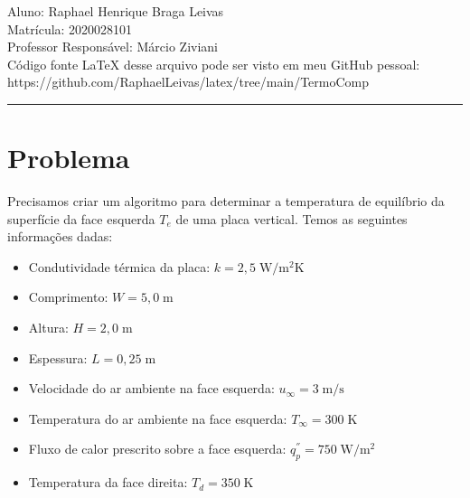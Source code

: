 \documentclass[12pt]{scrartcl}
\newcommand{\un}[1]{\;\textrm{#1}}
\begin{document}



\pagestyle{fancy}

\fancyhead{}
\fancyfoot{}

\begin{center}
    Aluno: Raphael Henrique Braga Leivas \\
    Matrícula: 2020028101 \\
    Professor Responsável: Márcio Ziviani \\[20pt]

    Código fonte LaTeX desse arquivo pode ser visto em meu GitHub pessoal: https://github.com/RaphaelLeivas/latex/tree/main/TermoComp
\end{center}

\hrule

\section{Problema}

Precisamos criar um algoritmo para determinar a temperatura de equilíbrio da superfície
da face esquerda $T_e$ de uma placa vertical. Temos as seguintes informações dadas:

\begin{itemize}
    \item Condutividade térmica da placa: $k=2,5 \un{W/m$^2$K}$
    \item Comprimento: $W=5,0 \un{m}$
    \item Altura: $H=2,0 \un{m}$
    \item Espessura: $L=0,25 \un{m}$
    \item Velocidade do ar ambiente na face esquerda: $u_{\infty}=3 \un{m/s}$
    \item Temperatura do ar ambiente na face esquerda: $T_{\infty}=300 \un{K}$
    \item Fluxo de calor prescrito sobre a face esquerda: $q_{p}^{''}=750 \un{W/m$^2$}$
    \item Temperatura da face direita: $T_d=350 \un{K}$
\end{itemize}
\end{document}
